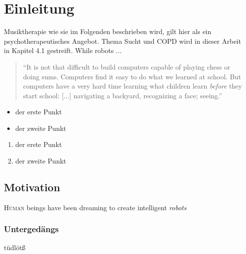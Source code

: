 \chapter{Einleitung}
\ifpdf
    \graphicspath{{1_introduction/figures/PNG/}{1_einleitung/figures/PDF/}{1_einleitung/figures/}}
\else
    \graphicspath{{1_einleitung/figures/EPS/}{1_einleitung/figures/}}
\fi


Musiktherapie wie sie im Folgenden beschrieben wird, gilt hier als ein psychotherapeutisches Angebot.
Thema Sucht und COPD wird in dieser Arbeit in Kapitel 4.1 gestreift. 
While robots ...

\begin{quote}
``It is not that difficult to build computers capable of playing chess or doing sums. Computers find it easy to do what we learned at school. But computers have a very hard time learning what children learn \textit{before} they start school: [...] navigating a backyard, recognizing a face; seeing.'' 
\end{quote}

\begin{itemize}
\item der erste Punkt
\item der zweite Punkt
\end{itemize}

\begin{enumerate}
\item der erste Punkt
\item der zweite Punkt
\end{enumerate}

\section{Motivation} %
\lettrine{H}{uman} beings have been dreaming to create intelligent \emph{robots} 

\subsection{Untergedängs}
tüdlötß
